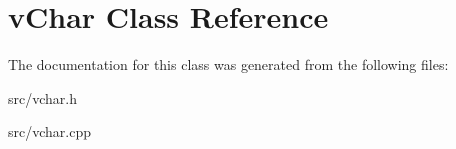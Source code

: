 \hypertarget{classv_char}{\section{v\-Char Class Reference}
\label{classv_char}
}


The documentation for this class was generated from the following files\-:\begin{DoxyCompactItemize}
\item 
src/vchar.\-h\item 
src/vchar.\-cpp\end{DoxyCompactItemize}
